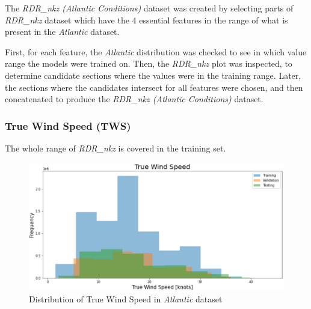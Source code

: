 The \textit{RDR\_nkz (Atlantic Conditions)} dataset was created by selecting parts of \textit{RDR\_nkz} dataset which have the 4 essential features in the range of what is present in the \textit{Atlantic} dataset.

First, for each feature, the \textit{Atlantic} distribution was checked to see in which value range the models were trained on. Then, the \textit{RDR\_nkz} plot was inspected, to determine candidate sections where the values were in the training range. Later, the sections where the candidates intersect for all features were chosen, and then concatenated to produce the \textit{RDR\_nkz (Atlantic Conditions)} dataset.

\clearpage
\subsubsection{True Wind Speed (TWS)}
The whole range of \textit{RDR\_nkz} is covered in the training set.

\begin{figure}[h]
\centering
\includegraphics[width = \hsize]{figures/distributions/atlantic-TWS.png}
\caption{Distribution of True Wind Speed in \textit{Atlantic} dataset \cite{charles}}
\label{fig:atlantic-tws}
\end{figure}

